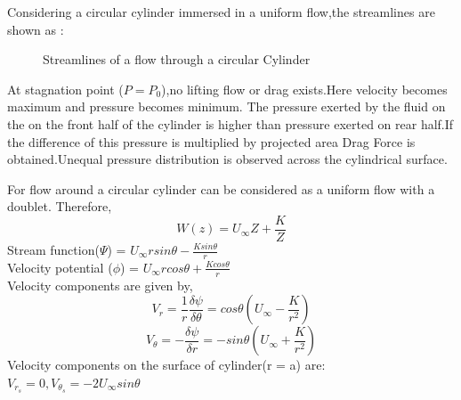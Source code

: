 \documentclass[12pt,a4paper]{article}
\begin{document}
Considering a circular cylinder immersed in a uniform flow,the streamlines are shown as :
\begin{figure}[!ht]
	\begin{center}
	\end{center}
	\caption{Streamlines of a flow through a circular Cylinder}
\end{figure}



At stagnation point ($P = P_0 $),no lifting flow or drag exists.Here velocity becomes maximum and pressure becomes minimum.
The pressure exerted by the fluid on the on the front half of the cylinder is higher than pressure exerted on rear half.If the difference of this pressure is multiplied by projected area Drag Force is obtained.Unequal pressure distribution is observed across the cylindrical surface. 



For flow around a circular cylinder can be considered as a uniform flow with a doublet.
Therefore, $$ W(z) = U_{\infty} Z + \frac{K}{Z} $$ 
Stream function($\Psi$) = $U_{\infty} r sin\theta -\frac{K sin\theta}{r}$ \\
Velocity potential ($\phi$) = $U_{\infty} r cos\theta + \frac{K cos\theta}{r}$ \\


Velocity components are given by,
$$V_r = \frac{1}{r} \frac{\delta \psi}{\delta \theta} = cos\theta(U_{\infty}- \frac{K}{r^2})$$
$$V_{\theta} = -\frac{\delta \psi}{\delta r} = -sin\theta (U_{\infty} + \frac{K}{r^2}) $$
Velocity components on the surface of cylinder(r = a) are:\\
 $V_r_s = 0 , V_{\theta}_s = -2U_{\infty} sin\theta $ \\
\end{document}
